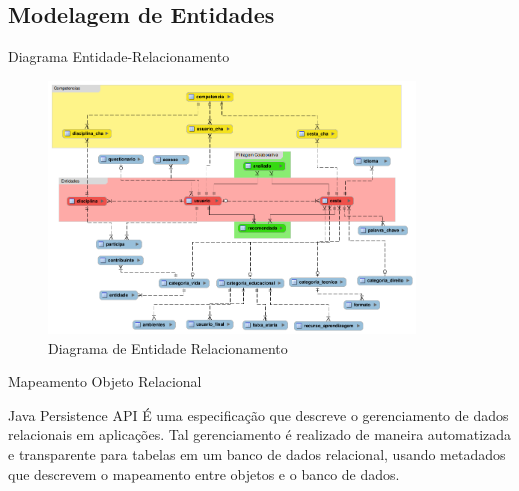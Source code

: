 \documentclass[xcolor=dvipsnames]{beamer}
\begin{document}
\subsection{Modelagem de Entidades}
		\begin{frame}{Diagrama Entidade-Relacionamento}

\begin{figure}[!htb]
	\centering
	\includegraphics[keepaspectratio=true,height=6.7cm]{recomendador-ER.png}
	\caption{Diagrama de Entidade Relacionamento}
	\label{rec-ER}
\end{figure}

		\end{frame}

\begin{frame}{Mapeamento Objeto Relacional}
	
	\begin{block}{Java Persistence API}
É uma especificação que descreve o gerenciamento de dados relacionais em aplicações. Tal gerenciamento é realizado de maneira automatizada e transparente para tabelas em um banco de dados relacional, usando metadados que descrevem o mapeamento entre objetos e o banco de dados.	
	\end{block}		

\end{frame}	
\end{document}
